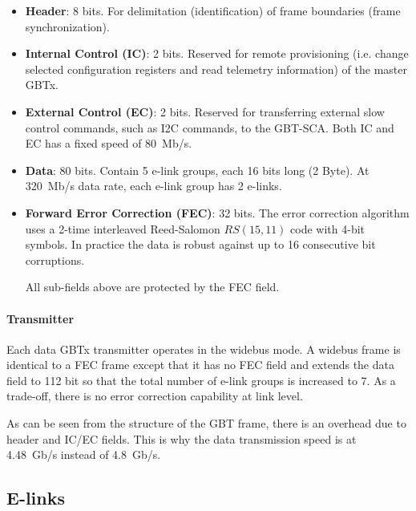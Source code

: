 \begin{itemize}
    \item \textbf{Header}:
        8 bits.
        For delimitation (identification) of frame boundaries
        (frame synchronization).

    \item \textbf{Internal Control (IC)}:
        2 bits.
        Reserved for remote provisioning
        (i.e. change selected configuration registers and read telemetry
        information) of the master GBTx.

    \item \textbf{External Control (EC)}:
        2 bits.
        Reserved for transferring external slow control commands,
        such as I2C commands, to the GBT-SCA.
        Both IC and EC has a fixed speed of 80~Mb/s.

    \item \textbf{Data}:
        80 bits.
        Contain 5 e-link groups, each 16 bits long (2 Byte).
        At 320~Mb/s data rate, each e-link group has 2 e-links.

    \item \textbf{Forward Error Correction (FEC)}:
        32 bits.
        The error correction algorithm uses a 2-time interleaved Reed-Salomon
        $RS(15, 11)$ code with 4-bit symbols.
        In practice the data is robust against up to 16 consecutive bit
        corruptions.

        All sub-fields above are protected by the FEC field.
\end{itemize}

\paragraph{Transmitter}
Each data GBTx transmitter operates in the widebus mode.
A widebus frame is identical to a FEC frame except that it has no FEC field and
extends the data field to 112 bit so that the total number of e-link groups is
increased to 7.
As a trade-off, there is no error correction capability at link level.

As can be seen from the structure of the GBT frame, there is an overhead
due to header and IC/EC fields.
This is why the data transmission speed is at 4.48~Gb/s instead of 4.8~Gb/s.


\subsection{E-links}
\label{dcb-elink}

